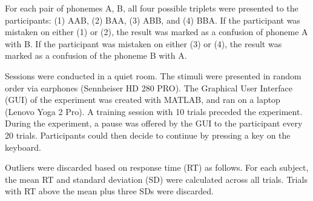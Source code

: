 For each pair of phonemes {A, B}, all four possible triplets were presented to the participants: (1) AAB, (2) BAA, (3) ABB, and (4) BBA. If the participant was mistaken on either (1) or (2), the result was marked as a confusion of phoneme A with B. If the participant was mistaken on either (3) or (4), the result was marked as a confusion of the phoneme B with A. 

Sessions were conducted in a quiet room. The stimuli were presented in random order via earphones (Sennheiser HD 280 PRO). The Graphical User Interface (GUI) of the experiment was created with MATLAB, and ran on a laptop (Lenovo Yoga 2 Pro). A training session with 10 trials preceded the experiment. During the experiment, a pause was offered by the GUI to the participant every 20 trials. Participants could then decide to continue by pressing a key on the keyboard.

Outliers were discarded based on response time (RT) as follows. For each subject, the mean RT and standard deviation (SD) were calculated across all trials. Trials with RT above the mean plus three SDs were discarded.